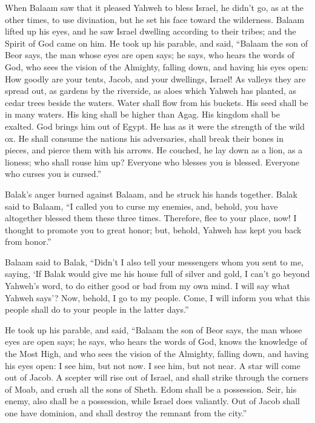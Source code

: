  When Balaam saw that it pleased Yahweh to bless Israel,
he didn't go, as at the other times, to use divination, but he set his
face toward the wilderness.  Balaam lifted up his eyes,
and he saw Israel dwelling according to their tribes; and the Spirit of
God came on him.  He took up his parable, and said,
``Balaam the son of Beor says, the man whose eyes are open says;
 he says, who hears the words of God, who sees the vision
of the Almighty, falling down, and having his eyes open: 
How goodly are your tents, Jacob, and your dwellings, Israel!
 As valleys they are spread out, as gardens by the
riverside, as aloes which Yahweh has planted, as cedar trees beside the
waters.  Water shall flow from his buckets. His seed shall
be in many waters. His king shall be higher than Agag. His kingdom shall
be exalted.  God brings him out of Egypt. He has as it
were the strength of the wild ox. He shall consume the nations his
adversaries, shall break their bones in pieces, and pierce them with his
arrows.  He couched, he lay down as a lion, as a lioness;
who shall rouse him up? Everyone who blesses you is blessed. Everyone
who curses you is cursed.''

 Balak's anger burned against Balaam, and he struck his
hands together. Balak said to Balaam, ``I called you to curse my
enemies, and, behold, you have altogether blessed them these three
times.  Therefore, flee to your place, now! I thought to
promote you to great honor; but, behold, Yahweh has kept you back from
honor.''

 Balaam said to Balak, ``Didn't I also tell your
messengers whom you sent to me, saying,  `If Balak would
give me his house full of silver and gold, I can't go beyond Yahweh's
word, to do either good or bad from my own mind. I will say what Yahweh
says'?  Now, behold, I go to my people. Come, I will
inform you what this people shall do to your people in the latter
days.''

 He took up his parable, and said, ``Balaam the son of
Beor says, the man whose eyes are open says;  he says,
who hears the words of God, knows the knowledge of the Most High, and
who sees the vision of the Almighty, falling down, and having his eyes
open:  I see him, but not now. I see him, but not near. A
star will come out of Jacob. A scepter will rise out of Israel, and
shall strike through the corners of Moab, and crush all the sons of
Sheth.  Edom shall be a possession. Seir, his enemy, also
shall be a possession, while Israel does valiantly.  Out
of Jacob shall one have dominion, and shall destroy the remnant from the
city.''

